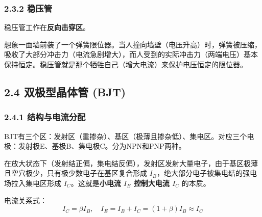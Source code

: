 \documentclass[12pt,a4paper]{ctexart}
\begin{document}
	\subsubsection*{2.3.2 稳压管}
	稳压管工作在\textbf{反向击穿区}。
	\begin{tipbox}
		想象一面墙前装了一个弹簧限位器。当人撞向墙壁（电压升高）时，弹簧被压缩，吸收了大部分冲击力（电流急剧增大），而人受到的实际冲击力（两端电压）基本保持恒定。稳压管就是那个牺牲自己（增大电流）来保护电压恒定的限位器。
	\end{tipbox}
	\subsection*{2.4 双极型晶体管 (BJT)}
	\subsubsection*{2.4.1 结构与电流分配}
	BJT有三个区：发射区（重掺杂）、基区（极薄且掺杂低）、集电区。对应三个电极：发射极E、基极B、集电极C。分为NPN和PNP两种。
	\begin{notebox}[BJT放大的核心逻辑]
		在放大状态下（发射结正偏，集电结反偏），发射区发射大量电子，由于基区极薄且空穴极少，只有极少数电子在基区复合形成 $I_B$，绝大部分电子被集电结的强电场拉入集电区形成 $I_C$。这就是\textbf{小电流 $I_B$ 控制大电流 $I_C$} 的本质。
	\end{notebox}
	电流关系式：
	$$ I_C = \beta I_B, \quad I_E = I_B + I_C = (1+\beta)I_B \approx I_C $$
\end{document}
